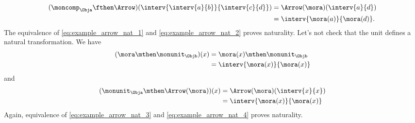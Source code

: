 %
\begin{equation}
    \label{eq:example_arrow_nat_2}
    \begin{aligned}
        (\moncomp_\Obja \fthen \Arrow)(\interv{\interv{a}{b}}{\interv{c}{d}})
         & =\Arrow(\mora)(\interv{a}{d}) \\
         & =\interv{\mora(a)}{\mora(d)}.
    \end{aligned}
\end{equation}
%
The equivalence of \cref{eq:example_arrow_nat_1} and \cref{eq:example_arrow_nat_2} proves naturality.
Let's not check that the unit defines a natural transformation.
We have
%
\begin{equation}
    \label{eq:example_arrow_nat_3}
    \begin{aligned}
        (\mora \mthen \monunit_\Objb)(x)
         & =\mora(x)\mthen \monunit_\Objb \\
         & =\interv{\mora(x)}{\mora(x)}
    \end{aligned}
\end{equation}
%
and
%
\begin{equation}
    \label{eq:example_arrow_nat_4}
    \begin{aligned}
        (\monunit_\Obja \mthen \Arrow(\mora))(x)
         & =\Arrow(\mora)(\interv{x}{x}) \\
         & =\interv{\mora(x)}{\mora(x)}
    \end{aligned}
\end{equation}
%
Again, equivalence of \cref{eq:example_arrow_nat_3} and \cref{eq:example_arrow_nat_4} proves naturality.

